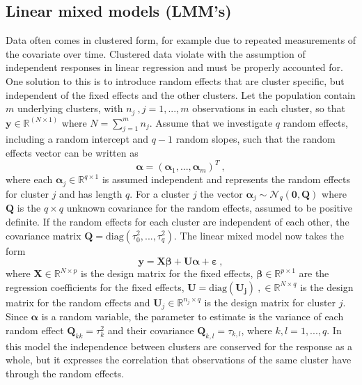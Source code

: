 \subsection{Linear mixed models (LMM's)}
\label{sec:LMM}
Data often comes in clustered form, for example due to repeated measurements of the covariate over time. 
Clustered data violate with the assumption of independent responses in linear regression and must be properly accounted for. One solution to this is to introduce random effects that are cluster specific, but independent of the fixed effects and the other clusters. Let the population contain $m$ underlying clusters, with $n_j\ , j=1, ..., m$ observations in each cluster, so that $\mathbf{y} \in \mathbb{R}^{(N \times 1)}$ where $N = \sum_{j=1}^m n_j $. Assume that we investigate $q$ random effects, including a random intercept and $q-1$ random slopes, such that the random effects vector can be written as 
\begin{equation}
    \label{eq:alpha}
    \boldsymbol{\alpha} = (\boldsymbol{\alpha}_1, ..., \boldsymbol{\alpha}_{m})^T \ ,
\end{equation}
where each $\boldsymbol{\alpha}_j \in \mathbb{R}^{q \times 1}$ is assumed independent and represents the random effects for cluster $j$ and has length $q$. For a cluster $j$ the vector $\boldsymbol{\alpha}_j \sim \mathcal{N}_q(\mathbf{0}, \mathbf{Q})$ where $\mathbf{Q}$ is the $q \times q$ unknown covariance for the random effects, assumed to be positive definite. 
If the random effects for each cluster are independent of each other, the covariance matrix $\mathbf{Q} = \text{diag}(\tau_0^2, ..., \tau_q^2)$.
The linear mixed model now takes the form
\begin{equation} \label{eq:LMM}
    \mathbf{y} = \mathbf{X}\boldsymbol{\beta} + \mathbf{U}\boldsymbol{\alpha} + \boldsymbol{\varepsilon} \ ,
\end{equation}
where $\mathbf{X} \in \mathbb{R}^{N \times p}$ is the design matrix for the fixed effects, $\boldsymbol{\beta} \in \mathbb{R}^{p \times 1}$ are the regression coefficients for the fixed effects, $\mathbf{U} = \text{diag}(\mathbf{U_j}) \ , \in \mathbb{R}^{N \times q}$ is the design matrix for the random effects and $\mathbf{U}_j \in \mathbb{R}^{n_j \times q}$ is the design matrix for cluster $j$. 
Since $\boldsymbol{\alpha}$ is a random variable, the parameter to estimate is the variance of each random effect $\mathbf{Q}_{kk}=\tau_k^2$ and their covariance $\mathbf{Q}_{k, l} = \tau_{k, l}$, where $k, l =1, ..., q$. 
In this model the independence between clusters are conserved for the response as a whole, but it expresses the correlation that observations of the same cluster have through the random effects.
